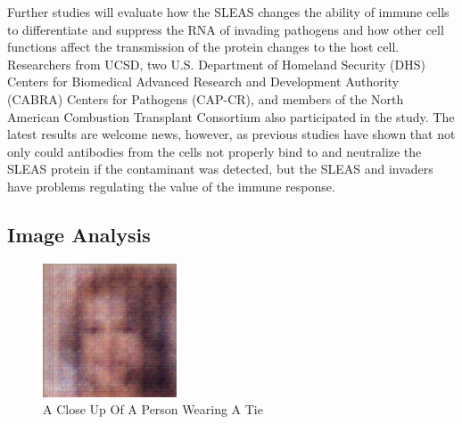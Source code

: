 \documentclass{article}%
\begin{document}
Further studies will evaluate how the SLEAS changes the ability of immune cells to differentiate and suppress the RNA of invading pathogens and how other cell functions affect the transmission of the protein changes to the host cell.\newline%
Researchers from UCSD, two U.S. Department of Homeland Security (DHS) Centers for Biomedical Advanced Research and Development Authority (CABRA) Centers for Pathogens (CAP{-}CR), and members of the North American Combustion Transplant Consortium also participated in the study.\newline%
The latest results are welcome news, however, as previous studies have shown that not only could antibodies from the cells not properly bind to and neutralize the SLEAS protein if the contaminant was detected, but the SLEAS and invaders have problems regulating the value of the immune response.

%
\subsection{Image Analysis}%
\label{subsec:ImageAnalysis}%


\begin{figure}[h!]%
\centering%
\includegraphics[width=150px]{500_fake_images/samples_5_356.png}%
\caption{A Close Up Of A Person Wearing A Tie}%
\end{figure}

%
\end{document}
